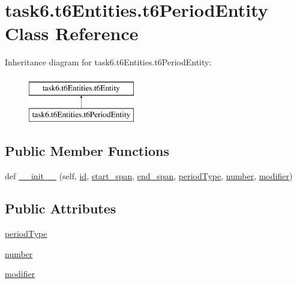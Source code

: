 \hypertarget{classtask6_1_1t6Entities_1_1t6PeriodEntity}{}\section{task6.\+t6\+Entities.\+t6\+Period\+Entity Class Reference}
\label{classtask6_1_1t6Entities_1_1t6PeriodEntity}
Inheritance diagram for task6.\+t6\+Entities.\+t6\+Period\+Entity\+:\begin{figure}[H]
\begin{center}
\leavevmode
\includegraphics[height=2.000000cm]{classtask6_1_1t6Entities_1_1t6PeriodEntity}
\end{center}
\end{figure}
\subsection*{Public Member Functions}
\begin{DoxyCompactItemize}
\item 
def \hyperlink{classtask6_1_1t6Entities_1_1t6PeriodEntity_a130190e151dd12e38c5d202e816ff71a}{\+\_\+\+\_\+init\+\_\+\+\_\+} (self, \hyperlink{classtask6_1_1t6Entities_1_1t6Entity_a96b2e7fb553c920ab2db6f6deb31e3b4}{id}, \hyperlink{classtask6_1_1t6Entities_1_1t6Entity_a8221c36d2995a24200cdfbd74cc9233c}{start\+\_\+span}, \hyperlink{classtask6_1_1t6Entities_1_1t6Entity_a597d42bb02fc9f42277098f0ce21917c}{end\+\_\+span}, \hyperlink{classtask6_1_1t6Entities_1_1t6PeriodEntity_ae2f4d463fe5601083ce5ce3070690f1d}{period\+Type}, \hyperlink{classtask6_1_1t6Entities_1_1t6PeriodEntity_a2cc588afdfc2e867cc652ef821015990}{number}, \hyperlink{classtask6_1_1t6Entities_1_1t6PeriodEntity_a62e35224ff25c299d13f00aab94d40b7}{modifier})
\end{DoxyCompactItemize}
\subsection*{Public Attributes}
\begin{DoxyCompactItemize}
\item 
\hyperlink{classtask6_1_1t6Entities_1_1t6PeriodEntity_ae2f4d463fe5601083ce5ce3070690f1d}{period\+Type}
\item 
\hyperlink{classtask6_1_1t6Entities_1_1t6PeriodEntity_a2cc588afdfc2e867cc652ef821015990}{number}
\item 
\hyperlink{classtask6_1_1t6Entities_1_1t6PeriodEntity_a62e35224ff25c299d13f00aab94d40b7}{modifier}
\end{DoxyCompactItemize}



